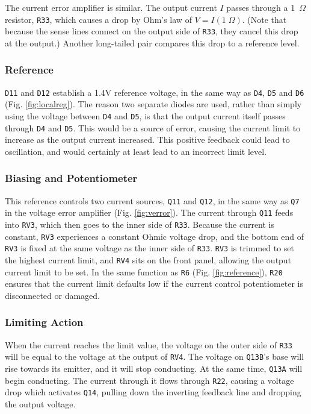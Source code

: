 \begin{multicols}{2}

The current error amplifier is similar. The output current $I$ passes through a
1~$\Omega$ resistor, \texttt{R33}, which causes a drop by Ohm's law of $V =
I(1\;\Omega)$. (Note that because the sense lines connect on the output side
of \texttt{R33}, they cancel this drop at the output.) Another long-tailed pair
compares this drop to a reference level.

\subsubsection{Reference}
\texttt{D11} and \texttt{D12} establish a 1.4\;V reference voltage, in the same
way as \texttt{D4}, \texttt{D5} and \texttt{D6} (Fig. \ref{fig:localreg}). The
reason two separate diodes are used, rather than simply using the voltage
between \texttt{D4} and \texttt{D5}, is that the output current itself passes
through \texttt{D4} and \texttt{D5}. This would be a source of error, causing
the current limit to increase as the output current increased. This positive
feedback could lead to oscillation, and would certainly at least lead to an
incorrect limit level.

\subsubsection{Biasing and Potentiometer}
This reference controls two current sources, \texttt{Q11} and \texttt{Q12}, in
the same way as \texttt{Q7} in the voltage error amplifier (Fig.
\ref{fig:verror}). The current through \texttt{Q11} feeds into \texttt{RV3},
which then goes to the inner side of \texttt{R33}. Because the current is
constant, \texttt{RV3} experiences a constant Ohmic voltage drop, and the
bottom end of \texttt{RV3} is fixed at the same voltage as the inner side
of \texttt{R33}. \texttt{RV3} is trimmed to set the highest current limit,
and \texttt{RV4} sits on the front panel, allowing the output current limit to
be set. In the same function as \texttt{R6} (Fig. \ref{fig:reference}),
\texttt{R20} ensures that the current limit defaults low if the current control
potentiometer is disconnected or damaged.

\subsubsection{Limiting Action}
When the current reaches the limit value, the voltage on the outer side of
\texttt{R33} will be equal to the voltage at the output of \texttt{RV4}.
The voltage on \texttt{Q13B}'s base will rise towards its emitter, and it will
stop conducting. At the same time, \texttt{Q13A} will begin conducting. The
current through it flows through \texttt{R22}, causing a voltage drop which
activates \texttt{Q14}, pulling down the inverting feedback line and dropping
the output voltage.


\end{multicols}
